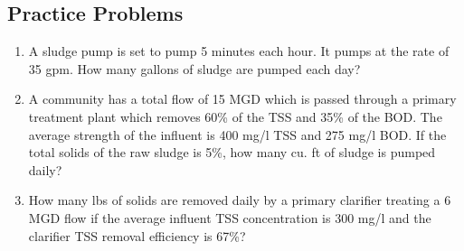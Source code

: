 \subsection{Practice Problems} 

\begin{enumerate}
\item A sludge pump is set to pump 5 minutes each hour. It pumps at the rate of 35 gpm. How many gallons of sludge are pumped each day?\\

\item A community has a total flow of 15 MGD which is passed through a primary treatment plant which removes 60\% of the TSS and 35\% of the BOD. The average strength of the influent is 400 mg/l TSS and 275 mg/l BOD. If the total solids of the raw sludge is 5\%, how many cu. ft of sludge is pumped daily?\\

\item How many lbs of solids are removed daily by a primary clarifier treating a 6 MGD flow if the average influent TSS concentration is 300 mg/l and the clarifier TSS removal efficiency is 67\%?\\

\end{enumerate}

